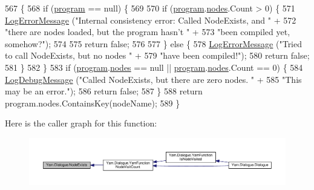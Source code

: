 \begin{DoxyCode}
567                                                 \{
568             \textcolor{keywordflow}{if} (\hyperlink{a00086_a0a1cca92325f430425d784d416cb5c2b}{program} == null) \{
569 
570                 \textcolor{keywordflow}{if} (\hyperlink{a00086_a0a1cca92325f430425d784d416cb5c2b}{program}.\hyperlink{a00146_a3f4928a577c88263ad016be259b175c4}{nodes}.Count > 0) \{
571                     \hyperlink{a00086_a9801e83dd044d6498fdf6ebcc6bec5ac}{LogErrorMessage} (\textcolor{stringliteral}{"Internal consistency error: Called NodeExists, and "} +
572                                      \textcolor{stringliteral}{"there are nodes loaded, but the program hasn't "} +
573                                      \textcolor{stringliteral}{"been compiled yet, somehow?"});
574 
575                     \textcolor{keywordflow}{return} \textcolor{keyword}{false};
576 
577                 \} \textcolor{keywordflow}{else} \{
578                     \hyperlink{a00086_a9801e83dd044d6498fdf6ebcc6bec5ac}{LogErrorMessage} (\textcolor{stringliteral}{"Tried to call NodeExists, but no nodes "} +
579                                      \textcolor{stringliteral}{"have been compiled!"});
580                     \textcolor{keywordflow}{return} \textcolor{keyword}{false};
581                 \}
582             \}
583             \textcolor{keywordflow}{if} (\hyperlink{a00086_a0a1cca92325f430425d784d416cb5c2b}{program}.\hyperlink{a00146_a3f4928a577c88263ad016be259b175c4}{nodes} == null || \hyperlink{a00086_a0a1cca92325f430425d784d416cb5c2b}{program}.\hyperlink{a00146_a3f4928a577c88263ad016be259b175c4}{nodes}.Count == 0) \{
584                 \hyperlink{a00086_a381f48bb0fbb294f8cf44ca57f11be31}{LogDebugMessage} (\textcolor{stringliteral}{"Called NodeExists, but there are zero nodes. "} +
585                                  \textcolor{stringliteral}{"This may be an error."});
586                 \textcolor{keywordflow}{return} \textcolor{keyword}{false};
587             \}
588             \textcolor{keywordflow}{return} program.nodes.ContainsKey(nodeName);
589         \}
\end{DoxyCode}


Here is the caller graph for this function\-:
\nopagebreak
\begin{figure}[H]
\begin{center}
\leavevmode
\includegraphics[width=350pt]{a00086_a93bb76a1f9a4058f225ff4cee97483c6_icgraph}
\end{center}
\end{figure}


